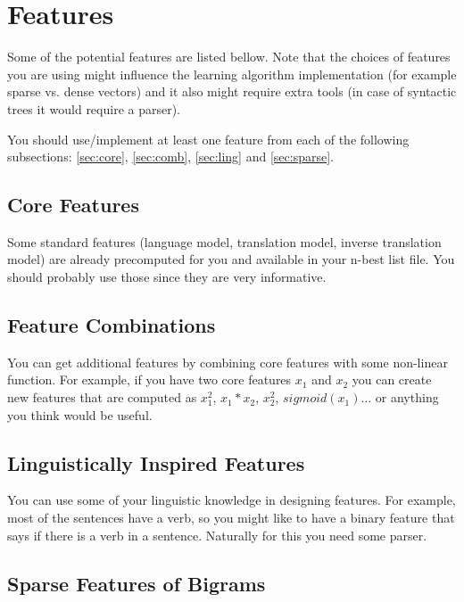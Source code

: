 
\section{Features}

Some of the potential features are listed bellow. Note that the choices of features you are using might influence the learning algorithm implementation (for example sparse vs. dense vectors) and it also might require extra tools (in case of syntactic trees it would require a parser).

You should use/implement at least one feature from each of the following subsections: \ref{sec:core}, \ref{sec:comb}, \ref{sec:ling} and \ref{sec:sparse}.


\subsection{\label{sec:core}Core Features}

Some standard features (language model, translation model, inverse translation model) are already precomputed for you and available in your n-best list file. You should probably use those since they are very informative.

\subsection{\label{sec:comb}Feature Combinations}

You can get additional features by combining core features with some non-linear function. For example, if you have two core features $x_1$ and $x_2$ you can create new features that are computed as $x_1^2$, $x_1*x_2$, $x_2^2$, $sigmoid(x_1)$... or anything you think would be useful.

\subsection{\label{sec:ling}Linguistically Inspired Features}

You can use some of your linguistic knowledge in designing features. For example, most of the sentences have a verb, so you might like to have a binary feature that says if there is a verb in a sentence. Naturally for this you need some parser.

\subsection{\label{sec:sparse}Sparse Features of Bigrams}

